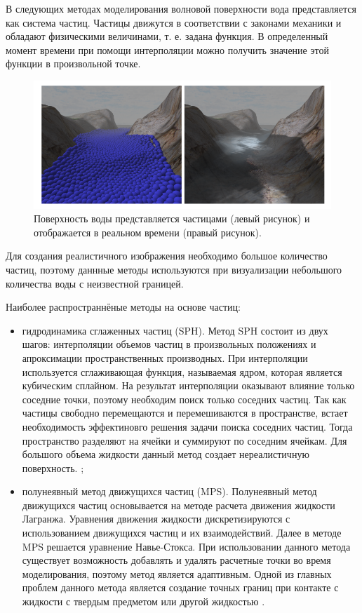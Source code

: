 В следующих методах моделирования волновой поверхности вода представляется как система частиц. Частицы движутся в соответствии с законами механики и обладают физическими величинами, т. е. задана функция. В определенный момент времени при помощи интерполяции можно получить значение этой функции в произвольной точке.

\begin{figure}[H]
	\begin{center}
		\includegraphics[scale=0.5]{img/particle.png}
	\end{center}
	\captionsetup{justification=centering}
	\caption{Поверхность воды представляется частицами (левый рисунок) и отображается в реальном времени (правый рисунок). }
	\label{img:particle}
\end{figure}

Для создания реалистичного изображения необходимо большое количество частиц, поэтому даннные методы используются при визуализации небольшого количества воды с неизвестной границей.   

Наиболее распространнёные методы на основе частиц:

\begin{itemize}
    \item гидродинамика сглаженных частиц (SPH). Метод SPH состоит из двух шагов: интерполяции объемов частиц в произвольных положениях и апроксимации пространственных производных. При интерполяции используется сглаживающая функция, называемая ядром, которая является кубическим сплайном. На результат интерполяции оказывают влияние только соседние точки, поэтому необходим поиск только соседних частиц. Так как частицы свободно перемещаются и перемешиваются в пространстве, встает необходимость эффектиновго решения задачи поиска соседних частиц. Тогда пространство разделяют на ячейки и суммируют по соседним ячейкам. Для большого объема жидкости данный метод создает нереалистичную поверхность. \cite{sph};
    \item полунеявный метод движущихся частиц (MPS). Полунеявный метод движущихся частиц основывается на методе расчета движения жидкости Лагранжа. Уравнения движения жидкости дискретизируются с использованием движущихся частиц и их взаимодействий. Далее в методе MPS решается уравнение Навье-Стокса. При использовании данного метода существует возможность добавлять и удалять расчетные точки во время моделирования, поэтому метод является адаптивным. Одной из главных проблем данного метода является создание точных границ при контакте с жидкости с твердым предметом или другой жидкостью \cite{mps}.
\end{itemize}

